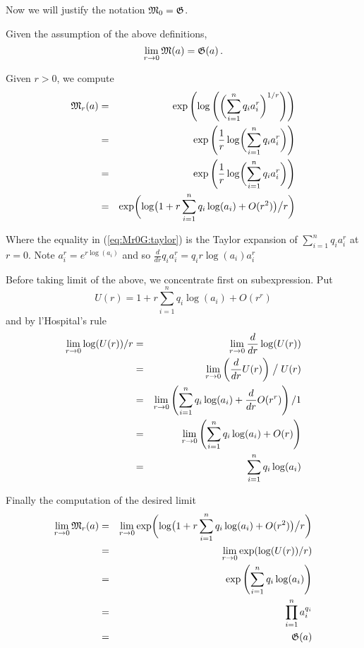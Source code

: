 Now we will justify the notation \(\mathfrak{M}_0 = \mathfrak{G}\).
\begin{lem} \label{lem:meanr0:g}
Given the assumption of the above definitions,
\begin{equation*}
\lim_{r\to 0} \mathfrak{M}(a) = \mathfrak{G}(a)\,.
\end{equation*}
\end{lem}
\begin{thmproof}
Given \(r>0\), we compute
\begin{eqnarray}
\mathfrak{M}_r(a)
 &=& \notag
  \exp\left(\log\left(\biggl(\sum_{i=1}^n q_i a_i^r\biggr)^{1/r}\right)\right) \\
 &=& \notag
  \exp\left(\frac{1}{r}\log\biggl(\sum_{i=1}^n q_i a_i^r\biggr)\right) \\
 &=& \notag
  \exp\left(\frac{1}{r}\log\biggl(\sum_{i=1}^n q_i a_i^r\biggr)\right) \\
 &=& \label{eq:Mr0G:taylor}
  \exp\biggl(\log\bigl(1 + r\sum_{i=1}^n q_i \log(a_i) + O(r^2)\bigr)\big/r\biggr)
\end{eqnarray}

Where the equality in (\ref{eq:Mr0G:taylor}) is the Taylor expansion
of \(\sum_{i=1}^n q_i a_i^r\)
at \(r=0\). Note \(a_i^r = e^{r\log(a_i)}\) and so
\(\frac{d}{dr} q_i a_i^r = q_i r \log(a_i)a_i^r\)

Before taking limit of the above, we concentrate first on subexpression.
Put
\begin{equation*}
 U(r) = 1 + r\sum_{i=1}^n q_i \log(a_i) + O(r^r)
\end{equation*}
and by l'Hospital's rule
\begin{eqnarray*}
\lim_{r\to 0} \log(U(r))/r
&=&
 \lim_{r\to 0} \frac{d}{dr} \log(U(r)) \\
&=&
 \lim_{r\to 0} \left(\frac{d}{dr} U(r) \right) \bigm/ U(r)  \\
&=&
 \lim_{r\to 0} \left(\sum_{i=1}^n q_i \log(a_i) + \frac{d}{dr}O(r^r)\right) / 1
 \\
&=& \lim_{r\to 0} \left(\sum_{i=1}^n q_i \log(a_i) + O(r)\right) \\
&=& \sum_{i=1}^n q_i \log(a_i)
\end{eqnarray*}


Finally the computation of the desired limit
\begin{eqnarray*}
\lim_{r\to 0} \mathfrak{M}_r(a)
&=&
 \lim_{r\to 0}
 \exp\biggl(\log\bigl(1 + r\sum_{i=1}^n q_i \log(a_i) +
                      O(r^2)\bigr)\big/r\biggr) \\
&=&  \lim_{r\to 0} \exp(\log(U(r))/r) \\
&=&  \exp\left(\sum_{i=1}^n q_i \log(a_i)\right) \\
&=&  \prod_{i=1}^n a_i^{q_i} \\
&=&  \mathfrak{G}(a)
\end{eqnarray*}
\end{thmproof}

